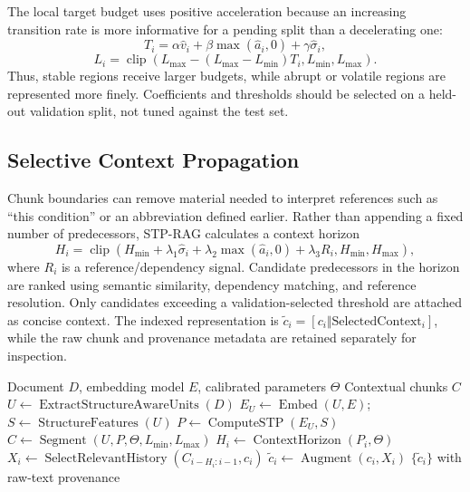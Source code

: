\documentclass[conference]{IEEEtran}
\begin{document}
The local target budget uses positive acceleration because an increasing transition rate is more informative for a pending split than a decelerating one:
\begin{equation}
T_i=\alpha\hat v_i+\beta\max(\hat a_i,0)+\gamma\hat\sigma_i,
\end{equation}
\begin{equation}
L_i=\operatorname{clip}(L_{\max}-(L_{\max}-L_{\min})T_i,L_{\min},L_{\max}).
\end{equation}
Thus, stable regions receive larger budgets, while abrupt or volatile regions are represented more finely. Coefficients and thresholds should be selected on a held-out validation split, not tuned against the test set.

\subsection{Selective Context Propagation}
Chunk boundaries can remove material needed to interpret references such as ``this condition'' or an abbreviation defined earlier. Rather than appending a fixed number of predecessors, STP-RAG calculates a context horizon
\begin{equation}
H_i=\operatorname{clip}(H_{\min}+\lambda_1\hat\sigma_i+\lambda_2\max(\hat a_i,0)+\lambda_3R_i,H_{\min},H_{\max}),
\end{equation}
where $R_i$ is a reference/dependency signal. Candidate predecessors in the horizon are ranked using semantic similarity, dependency matching, and reference resolution. Only candidates exceeding a validation-selected threshold are attached as concise context. The indexed representation is $\tilde c_i=[c_i\Vert\mathrm{SelectedContext}_i]$, while the raw chunk and provenance metadata are retained separately for inspection.

\begin{algorithm}[t]
\caption{STP-Guided Contextual Chunking}
\label{alg:chunking}
\begin{algorithmic}[1]
\Require Document $D$, embedding model $E$, calibrated parameters $\Theta$
\Ensure Contextual chunks $C$
\State $U\gets\operatorname{ExtractStructureAwareUnits}(D)$
\State $E_U\gets\operatorname{Embed}(U,E)$; $S\gets\operatorname{StructureFeatures}(U)$
\State $P\gets\operatorname{ComputeSTP}(E_U,S)$
\State $C\gets\operatorname{Segment}(U,P,\Theta,L_{\min},L_{\max})$
  \State $H_i\gets\operatorname{ContextHorizon}(P_i,\Theta)$
  \State $X_i\gets\operatorname{SelectRelevantHistory}(C_{i-H_i:i-1},c_i)$
  \State $\tilde c_i\gets\operatorname{Augment}(c_i,X_i)$
\EndFor
\State \Return $\{\tilde c_i\}$ with raw-text provenance
\end{algorithmic}
\end{algorithm}
\end{document}
